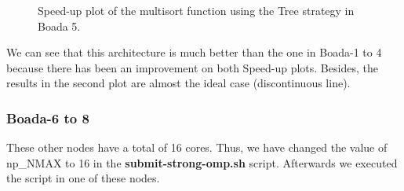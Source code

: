 \documentclass[12pt, a4paper]{article}
\begin{document}
\begin{figure}[H]
\begin{minipage}[b]{0.4\linewidth}
  \caption{Speed-up plot of the multisort function using the Tree strategy in Boada 5.}
  \label{fig:mandel-omp-10000-strong-21-speedup}
\end{minipage}
\end{figure}

We can see that this architecture is much better than the one in Boada-1 to 4 because there has been an improvement on both Speed-up plots. Besides, the results in the second plot are almost the ideal case (discontinuous line).

\subsubsection{Boada-6 to 8}

These other nodes have a total of 16 cores. Thus, we have changed the value of np\_NMAX to 16 in the \textbf{submit-strong-omp.sh} script. Afterwards we executed the script in one of these nodes.
\end{document}
